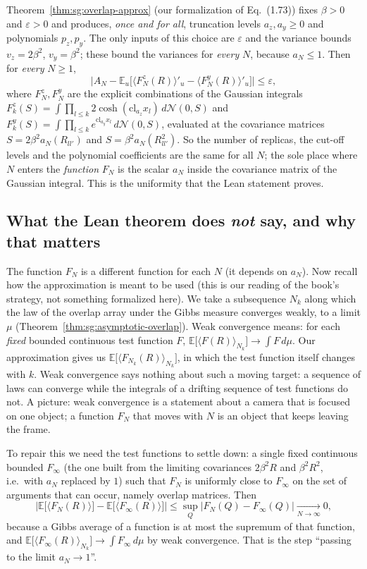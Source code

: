 Theorem~\ref{thm:sg:overlap-approx} (our formalization of Eq.~(1.73)) fixes $\beta>0$ and $\varepsilon>0$ and produces, \emph{once and for all}, truncation levels $a_z,a_y\ge0$ and polynomials $p_z,p_y$. The only inputs of this choice are $\varepsilon$ and the variance bounds
$v_z=2\beta^2$, $v_y=\beta^2$; these bound the variances for \emph{every} $N$, because $a_N\le1$. Then for \emph{every} $N\ge1$,
\[\Big|A_N-\mathbb E_u\Big[\langle F^z_{N}(R)\rangle'_u-\langle F^y_{N}(R)\rangle'_u\Big]\Big|\le\varepsilon,\]
where $F^z_N,F^y_N$ are the explicit combinations of the Gaussian integrals
$F^z_k(S)=\int\prod_{l\le k}2\cosh(\mathrm{cl}_{a_z}x_l)\,d\mathcal N(0,S)$ and $F^y_k(S)=\int\prod_{l\le k}e^{\mathrm{cl}_{a_y}x_l}\,d\mathcal N(0,S)$, evaluated at the covariance matrices $S=2\beta^2a_N(R_{ll'})$ and $S=\beta^2a_N(R_{ll'}^2)$.
So the number of replicas, the cut-off levels and the polynomial coefficients are the same for all $N$; the sole place where $N$ enters the \emph{function} $F_N$ is the scalar $a_N$ inside the covariance matrix of the Gaussian integral. This is the uniformity that the Lean statement proves.

\subsection*{What the Lean theorem does \emph{not} say, and why that matters}

The function $F_N$ is a different function for each $N$ (it depends on $a_N$). Now recall how the approximation is meant to be used (this is our reading of the book's strategy, not something formalized here). We take a subsequence $N_k$ along which the law of the overlap array
under the Gibbs measure converges weakly, to a limit $\mu$ (Theorem~\ref{thm:sg:asymptotic-overlap}). Weak convergence means: for each \emph{fixed} bounded continuous test function $F$, $\mathbb E\big[\langle F(R)\rangle_{N_k}\big]\to\int F\,d\mu$.
Our approximation gives us $\mathbb E\big[\langle F_{N_k}(R)\rangle_{N_k}\big]$, in which the test function itself changes with $k$. Weak convergence says nothing about such a moving target: a sequence of laws can converge while the integrals of a drifting sequence of test functions do not.
A picture: weak convergence is a statement about a camera that is focused on one object; a function $F_{N}$ that moves with $N$ is an object that keeps leaving the frame.

To repair this we need the test functions to settle down: a single fixed continuous bounded $F_\infty$ (the one built from the limiting covariances $2\beta^2R$ and $\beta^2R^2$, i.e.\ with $a_N$ replaced by $1$) such that $F_N$ is uniformly close to $F_\infty$ on the set of arguments that can occur,
namely overlap matrices. Then
\[\big|\mathbb E\big[\langle F_N(R)\rangle\big]-\mathbb E\big[\langle F_\infty(R)\rangle\big]\big|\le\sup_Q|F_N(Q)-F_\infty(Q)|\xrightarrow[N\to\infty]{}0,\]
because a Gibbs average of a function is at most the supremum of that function, and $\mathbb E\big[\langle F_\infty(R)\rangle_{N_k}\big]\to\int F_\infty\,d\mu$ by weak convergence. That is the step ``passing to the limit $a_N\to1$''.

